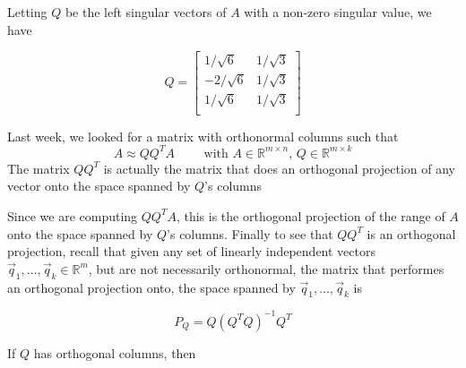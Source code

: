 Letting $Q$ be the left singular vectors of $A$ with a non-zero singular value, we have

\begin{equation*}
    Q =
    \begin{bmatrix}
    1/ \sqrt{6} & 1/\sqrt{3}\\
    -2/\sqrt{6} & 1/\sqrt{3}\\
    1/ \sqrt{6} & 1/\sqrt{3}\\
    \end{bmatrix}
\end{equation*}


Last week, we looked for a matrix with orthonormal columns such that
\begin{equation*}
    A \approx QQ^TA \qquad \text{ with } A\in\mathbb{R}^{m\times n},\, Q \in \mathbb{R}^{m\times k}
\end{equation*}
The matrix $QQ^T$ is actually the matrix that does an orthogonal projection of any vector onto the space spanned by $Q$'s columns


\vspace{0.5cm}
\begin{center}
    
\end{center}
\vspace{0.5cm}

Since we are computing $QQ^TA$, this is the orthogonal projection of the range of $A$ onto the space spanned by $Q$'s columns. Finally to see that $QQ^T$ is an orthogonal projection, recall that given any set of linearly independent vectors $\vec{q}_1, \ldots, \vec{q}_k \in \mathbb{R}^m$, but are not necessarily orthonormal, the matrix that performes an orthogonal projection onto, the space spanned by $\vec{q}_1, \ldots, \vec{q}_k$ is

\begin{equation*}
    P_Q = Q \left( Q^T Q \right)^{-1} Q^T
\end{equation*}

If $Q$ has orthogonal columns, then

